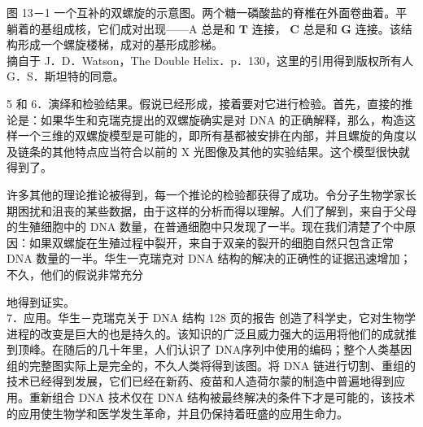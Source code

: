 图 13－1 一个互补的双螺旋的示意图。两个糖一磷酸盐的脊椎在外面卷曲着。平躺着的基组成核，它们成对出现——A 总是和 $\mathbf{T}$ 连接， $\mathbf{C}$ 总是和 $\mathbf{G}$ 连接。该结构形成一个螺旋楼梯，成对的基形成胗梯。\\
摘自于 J．D．Watson，The Double Helix．p．130，这里的引用得到版权所有人 G．S．斯坦特的同意。

5 和 6．演绎和检验结果。假说已经形成，接着要对它进行检验。首先，直接的推论是：如果华生和克瑞克提出的双螺旋确实是对 DNA 的正确解释，那么，构造这样一个三维的双螺旋模型是可能的，即所有基都被安排在内部，并且螺旋的角度以及链条的其他特点应当符合以前的 X 光图像及其他的实验结果。这个模型很快就得到了。

许多其他的理论推论被得到，每一个推论的检验都获得了成功。令分子生物学家长期困扰和沮丧的某些数据，由于这样的分析而得以理解。人们了解到，来自于父母的生殖细胞中的 DNA 数量，在普通细胞中只发现了一半。现在我们清楚了个中原因：如果双螺旋在生殖过程中裂开，来自于双亲的裂开的细胞自然只包含正常 DNA 数量的一半。华生一克瑞克对 DNA 结构的解决的正确性的证据迅速增加；不久，他们的假说非常充分

地得到证实。\\
7．应用。华生－克瑞克关于 DNA 结构 128 页的报告\cite{watson1953} 创造了科学史，它对生物学进程的改变是巨大的也是持久的。该知识的广泛且威力强大的运用将他们的成就推到顶峰。在随后的几十年里，人们认识了 DNA序列中使用的编码；整个人类基因组的完整图实际上是完全的，不久人类将得到该图。将 DNA 链进行切割、重组的技术已经得到发展，它们已经在新药、疫苗和人造荷尔蒙的制造中普遍地得到应用。重新组合 DNA 技术仅在 DNA 结构被最终解决的条件下才是可能的，该技术的应用使生物学和医学发生革命，并且仍保持着旺盛的应用生命力。

